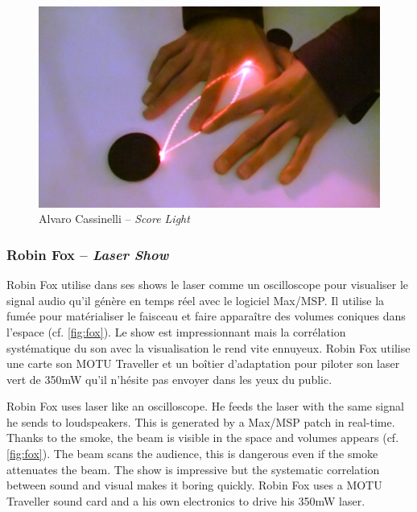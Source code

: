 \begin{figure}[ht]
\begin{center}
\includegraphics[width=\textwidth]{images/cassinellinews2.jpg} 
\end{center}
\caption{Alvaro Cassinelli -- \textit{Score Light}}
\label{fig:cassinelli}
\end{figure}

\subsubsection{Robin Fox -- \textit{Laser Show}}
\begin{fr}
Robin Fox utilise dans ses shows le laser comme un oscilloscope pour visualiser le signal audio qu'il génère en temps réel avec le logiciel Max/MSP. 
Il utilise la fumée pour matérialiser le faisceau et faire apparaître des volumes coniques dans l'espace (cf. \ref{fig:fox}).
Le show est impressionnant mais la corrélation systématique du son avec la visualisation le rend vite ennuyeux. 
Robin Fox utilise une carte son MOTU Traveller et un boîtier d'adaptation pour piloter son laser vert de 350\unit{mW} qu'il n'hésite pas envoyer dans les yeux du public.
\end{fr}

\begin{en}
Robin Fox uses laser like an oscilloscope.
He feeds the laser with the same signal he sends to loudspeakers.
This is generated by a Max/MSP patch in real-time.
Thanks to the smoke, the beam is visible in the space and volumes appears (cf. \ref{fig:fox}).
The beam scans the audience, this is dangerous even if the smoke attenuates the beam.
The show is impressive but the systematic correlation between sound and visual makes it boring quickly.
Robin Fox uses a MOTU Traveller sound card and a his own electronics to drive his 350\unit{mW} laser.
\end{en}

